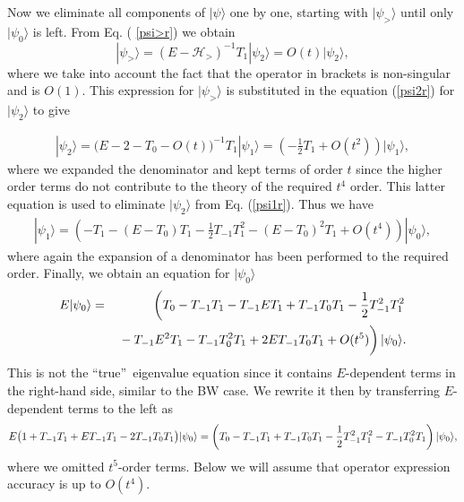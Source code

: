 \documentclass[floatfix,twocolumn,aps,prb,showpacs,superscriptaddress]{revtex4}
\def\tone{T_1}
\def\tzero{T_0}
\begin{document}
Now we eliminate all components of $|\psi \rangle $ one by one, starting
with $|\psi _{>}\rangle $ until only $|\psi _{0}\rangle $ is left. From Eq. (%
\ref{psi>r}) we obtain 
\[
|\psi _{>}\rangle =\left( E-\mathcal{H}_{>}\right) ^{-1}T_{1}|\psi
_{2}\rangle =O(t)|\psi _{2}\rangle , 
\]%
where we take into account the fact that the operator in brackets is
non-singular and is $O(1)$. This expression for $|\psi _{>}\rangle $ is
substituted in the equation (\ref{psi2r}) for $|\psi _{2}\rangle $ to give 
\begin{widetext}%
\begin{eqnarray}
|\psi _{2}\rangle =\big(E-2-T_{0}-O(t)\big)^{-1}T_{1}|\psi _{1}\rangle
 =\left( -\frac{1}{2}T_{1}+O(t^{2})\right) |\psi _{1}\rangle , \label{psi2r_exp}
\end{eqnarray}%
where we expanded the denominator and kept terms of order $t$ since the
higher order terms do not contribute to the theory of the required $t^{4}$
order. This latter equation is used to eliminate $|\psi _{2}\rangle $ from
Eq. (\ref{psi1r}). Thus we  have
\begin{eqnarray}
|\psi _{1}\rangle =\left( -T_{1}-(E-T_{0})T_{1}-\frac{1}{2}%
T_{-1}\tone^2-(E-T_{0})^{2}T_{1}+O(t^{4})\right) |\psi
_{0}\rangle ,   \label{psi1r_exp} 
\end{eqnarray}%
where again the expansion of a denominator has been performed to the
required order. Finally, we obtain an equation for $|\psi
_{0}\rangle $ 
\begin{eqnarray}
E|\psi _{0}\rangle &=&\left( T_{0}-T_{-1}T_{1}-T_{-1}ET_{1}+T_{-1}T_{0}T_{1}-%
\frac{1}{2}\tm^2\tone^2\right.  \nonumber \\
&&\left. \vphantom{\frac{1}{2}}%
-T_{-1}E^{2}T_{1}-T_{-1}\tzero^2T_{1}+2ET_{-1}T_{0}T_{1}+O(t^{5})\right)
|\psi _{0}\rangle .
\end{eqnarray}%
This is not the \textquotedblleft true\textquotedblright\ eigenvalue
equation since it contains $E$-dependent terms in the right-hand side,
similar to the BW case. We rewrite it then by transferring $E$-dependent
terms to the left as 
\begin{equation}
E\big(1+T_{-1}T_{1}+ET_{-1}T_{1}-2T_{-1}T_{0}T_{1}\big)|\psi _{0}\rangle
=\left( T_{0}-T_{-1}T_{1}+T_{-1}T_{0}T_{1}-\frac{1}{2}%
\tm^2\tone^2-T_{-1}\tzero^2T_{1}\right) |\psi _{0}\rangle ,
\label{ER1}
\end{equation}%
where we omitted $t^{5}$-order terms. Below we will assume that operator
expression accuracy is up to $O(t^{4})$.



\end{widetext}
\end{document}
